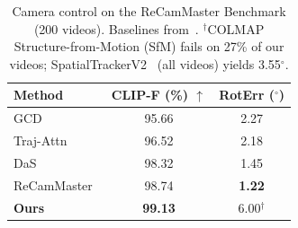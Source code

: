 \begin{table}[t]
\centering
\caption{Camera control on the ReCamMaster Benchmark (200 videos). Baselines from~\protect\cite{bai2025recammaster}. $^\dagger$COLMAP Structure-from-Motion (SfM) fails on 27\% of our videos; SpatialTrackerV2~\protect\cite{xiao2025spatialtracker} (all videos) yields 3.55$^\circ$.}
\label{tab:camera_comparison}
\setlength{\tabcolsep}{6pt}
\begin{tabular}{lcc}
\toprule
Method & CLIP-F (\%) $\uparrow$ & RotErr ($^\circ$)  \\
\midrule
GCD~\cite{van2024gcd} & 95.66 & 2.27 \\
Traj-Attn~\cite{xiao2025trajattn} & 96.52 & 2.18 \\
DaS~\cite{cheng2025das} & 98.32 & 1.45 \\
ReCamMaster~\cite{bai2025recammaster} & 98.74 & \textbf{1.22} \\
\midrule
\textbf{Ours} & \textbf{99.13} & 6.00$^\dagger$ \\
\bottomrule
\end{tabular}
\end{table}
